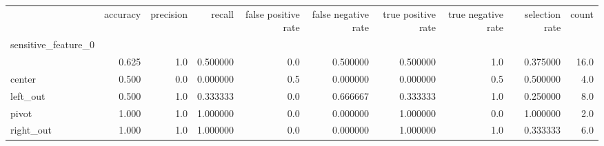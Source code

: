 \begin{tabular}{lrrrrrrrrr}
\toprule
{} &  accuracy &  precision &    recall &  false positive rate &  false negative rate &  true positive rate &  true negative rate &  selection rate &  count \\
sensitive\_feature\_0 &           &            &           &                      &                      &                     &                     &                 &        \\
\midrule
                    &     0.625 &        1.0 &  0.500000 &                  0.0 &             0.500000 &            0.500000 &                 1.0 &        0.375000 &   16.0 \\
center              &     0.500 &        0.0 &  0.000000 &                  0.5 &             0.000000 &            0.000000 &                 0.5 &        0.500000 &    4.0 \\
left\_out            &     0.500 &        1.0 &  0.333333 &                  0.0 &             0.666667 &            0.333333 &                 1.0 &        0.250000 &    8.0 \\
pivot               &     1.000 &        1.0 &  1.000000 &                  0.0 &             0.000000 &            1.000000 &                 0.0 &        1.000000 &    2.0 \\
right\_out           &     1.000 &        1.0 &  1.000000 &                  0.0 &             0.000000 &            1.000000 &                 1.0 &        0.333333 &    6.0 \\
\bottomrule
\end{tabular}
